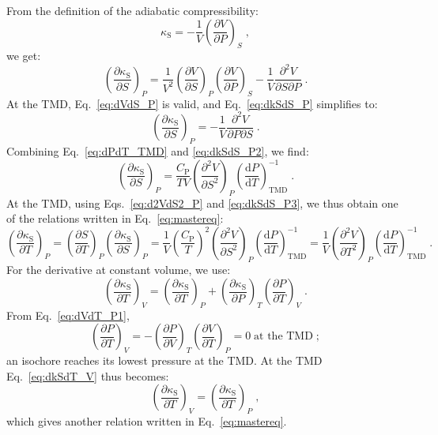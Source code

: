 \documentclass[12pt]{article}
\newcommand{\mrm}{\mathrm}
\newcommand{\kS}{\kappa_\mrm{S}}
\newcommand{\CP}{C_\mrm{P}}
\begin{document}
From the definition of the adiabatic compressibility:
\begin{equation}
\kS = - \frac{1}{V} \left( \frac{\partial V}{\partial P} \right)_S \; ,
\label{eq:kS}
\end{equation}
we get:
\begin{equation}
\left( \frac{\partial \kS}{\partial S} \right)_P = \frac{1}{V^2} \left(\frac{\partial V}{\partial S} \right)_P \left(\frac{\partial V}{\partial P} \right)_S - \frac{1}{V} \frac{\partial^2 V}{\partial S \partial P} \; .
\label{eq:dkSdS_P}
\end{equation}
At the TMD, Eq.~\ref{eq:dVdS_P} is valid, and Eq.~\ref{eq:dkSdS_P} simplifies to:
\begin{equation}
\left( \frac{\partial \kS}{\partial S} \right)_P = - \frac{1}{V} \frac{\partial^2 V}{\partial P \partial S} \; .
\label{eq:dkSdS_P2}
\end{equation}
Combining Eq.~\ref{eq:dPdT_TMD} and \ref{eq:dkSdS_P2}, we find:
\begin{equation}
\left( \frac{\partial \kS}{\partial S} \right)_P = \frac{\CP}{T V} \left( \frac{\partial^2 V}{\partial S^2} \right)_P \left(\frac{\mrm{d}P}{\mrm{d}T} \right)_\mrm{TMD}^{-1} \; .
\label{eq:dkSdS_P3}
\end{equation}
At the TMD, using Eqs.~\ref{eq:d2VdS2_P} and \ref{eq:dkSdS_P3}, we thus obtain one of the relations written in Eq.~\ref{eq:mastereq}:
\begin{equation}
\left( \frac{\partial \kS}{\partial T} \right)_P = \left( \frac{\partial S}{\partial T} \right)_P \left( \frac{\partial \kS}{\partial S} \right)_P = \frac{1}{V} \left( \frac{\CP}{T} \right)^2 \left( \frac{\partial^2 V}{\partial S^2} \right)_P \left(\frac{\mrm{d}P}{\mrm{d}T} \right)_\mrm{TMD}^{-1} = \frac{1}{V} \left( \frac{\partial^2 V}{\partial T^2} \right)_P \left(\frac{\mrm{d}P}{\mrm{d}T} \right)_\mrm{TMD}^{-1} \; .
\label{eq:dkSdT_P}
\end{equation}
For the derivative at constant volume, we use:
\begin{equation}
\left( \frac{\partial \kS}{\partial T} \right)_V = \left( \frac{\partial \kS}{\partial T} \right)_P + \left( \frac{\partial \kS}{\partial P} \right)_T \left(\frac{\partial P}{\partial T} \right)_V \; .
\label{eq:dkSdT_V}
\end{equation}
From Eq.~\ref{eq:dVdT_P1},
\begin{equation}
\left( \frac{\partial P}{\partial T} \right)_V = - \left( \frac{\partial P}{\partial V} \right)_T \left( \frac{\partial V}{\partial T} \right)_P = 0 \;\textrm{at the TMD} \; ;
\label{eq:dPdT_V}
\end{equation}
an isochore reaches its lowest pressure at the TMD. At the TMD Eq.~\ref{eq:dkSdT_V} thus becomes:
\begin{equation}
\left( \frac{\partial \kS}{\partial T} \right)_V = \left( \frac{\partial \kS}{\partial T} \right)_P \; ,
\label{eq:dkSdT_V2}
\end{equation}
which gives another relation written in Eq.~\ref{eq:mastereq}.
\end{document}

